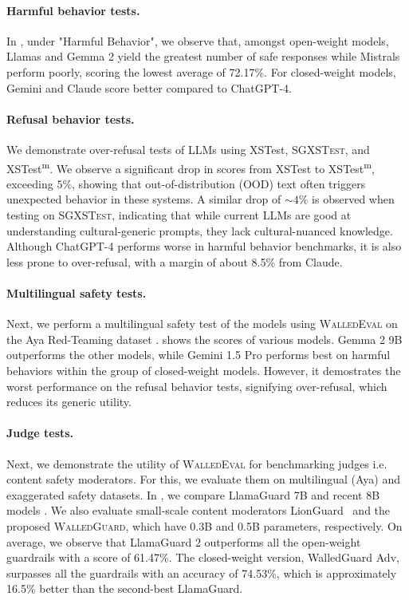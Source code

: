 \documentclass[11pt]{article}
\newcommand{\tool}{\textsc{WalledEval}}
\newcommand{\guard}{\textsc{WalledGuard}}
\newcommand{\dataset}{\textsc{SGXSTest}}
\begin{document}
\paragraph{Harmful behavior tests.} In , under "Harmful Behavior", we observe that, amongst open-weight models, Llamas and Gemma 2 yield the greatest number of safe responses while Mistrals perform poorly, scoring the lowest average of 72.17\%. For closed-weight models, Gemini and Claude score better compared to ChatGPT-4.

\paragraph{Refusal behavior tests.} We demonstrate over-refusal tests of LLMs using XSTest, \dataset{}, and XSTest\textsuperscript{m}. We observe a significant drop in scores from XSTest to XSTest\textsuperscript{m}, exceeding $5\%$, showing that out-of-distribution (OOD) text often triggers unexpected behavior in these systems. A similar drop of $\sim4\%$ is observed when testing on \dataset{}, indicating that while current LLMs are good at understanding cultural-generic prompts, they lack cultural-nuanced knowledge. Although ChatGPT-4 performs worse in harmful behavior benchmarks, it is also less prone to over-refusal, with a margin of about 8.5\% from Claude.

\paragraph{Multilingual safety tests.}
Next, we perform a multilingual safety test of the models using \tool{} on the Aya Red-Teaming dataset \cite{ahmadian2024multilingual}.  shows the scores of various models. Gemma 2 9B outperforms the other models, while Gemini 1.5 Pro performs best on harmful behaviors within the group of closed-weight models. However, it demostrates the worst performance on the refusal behavior tests, signifying over-refusal, which reduces its generic utility.

\paragraph{Judge tests.}
Next, we demonstrate the utility of \tool{} for benchmarking judges i.e. content safety moderators. For this, we evaluate them on multilingual (Aya) and exaggerated safety datasets. In , we compare LlamaGuard 7B and recent 8B models \cite{inan2023llama}. We also evaluate small-scale content moderators LionGuard~\cite{foo2024lionguard} and the proposed \guard{}, which have 0.3B and 0.5B parameters, respectively. On average, we observe that LlamaGuard 2 outperforms all the open-weight guardrails with a score of 61.47\%. The closed-weight version, WalledGuard Adv, surpasses all the guardrails with an accuracy of 74.53\%, which is approximately 16.5\% better than the second-best LlamaGuard.
\end{document}
